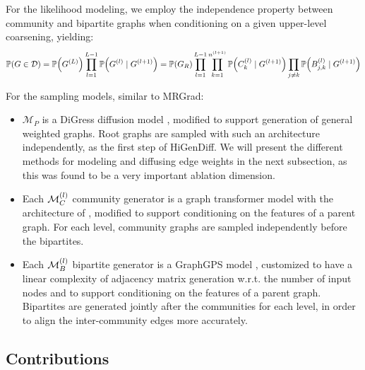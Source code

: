 For the likelihood modeling, we employ the independence property between community and bipartite graphs when conditioning on a given upper-level coarsening, yielding:
\begin{equation}
\mathbb{P}\mathopen{}\left(G \in \mathcal{D}\right)=\mathbb{P}\mathopen{}\left(G^{\mathopen{}\left(L\right)}\right)\prod_{l=1}^{L-1}{\mathbb{P}\mathopen{}\left(G^{\mathopen{}\left(l\right)} \mid G^{\mathopen{}\left(l+1\right)}\right)}=\mathbb{P}\mathopen{}\left(G_R\right)\prod_{l=1}^{L-1}\prod_{k=1}^{n^{\mathopen{}\left(l+1\right)}}{\mathbb{P}\mathopen{}\left(C_{k}^{\mathopen{}\left(l\right)} \mid G^{\mathopen{}\left(l+1\right)}\right)}\prod_{j \neq k}{\mathbb{P}\mathopen{}\left(B_{j,k}^{\mathopen{}\left(l\right)} \mid G^{\mathopen{}\left(l+1\right)}\right)}     
\end{equation}

For the sampling models, similar to MRGrad:
\begin{itemize}
    \item $\mathcal{M}_P$ is a DiGress diffusion model \cite{vignac_digress_2022}, modified to support generation of general weighted graphs. Root graphs are sampled with such an architecture independently, as the first step of HiGenDiff. We will present the different methods for modeling and diffusing edge weights in the next subsection, as this was found to be a very important ablation dimension. 
    \item Each $\mathcal{M}^{\mathopen{}\left(l\right)}_C$ community generator is a graph transformer model with the architecture of \cite{dwivedi_generalization_2021}, modified to support conditioning on the features of a parent graph. For each level, community graphs are sampled independently before the bipartites.
    \item Each $\mathcal{M}^{\mathopen{}\left(l\right)}_B$ bipartite generator is a GraphGPS model \cite{rampasek_recipe_2022}, customized to have a linear complexity of adjacency matrix generation w.r.t. the number of input nodes and to support conditioning on the features of a parent graph. Bipartites are generated jointly after the communities for each level, in order to align the inter-community edges more accurately.
\end{itemize}

\subsection{Contributions}

